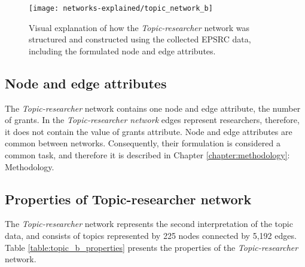 \begin{figure}[!htbp]
    \centering
    \texttt{[image: networks-explained/topic\_network\_b]}
    \caption[Visual explanation of how the \textit{Topic-researcher} network was structured and constructed using the collected EPSRC data]{Visual explanation of how the \textit{Topic-researcher} network was structured and constructed using the collected EPSRC data, including the formulated node and edge attributes.}
    \label{figure:topic_b_structure}
\end{figure}

\subsection{Node and edge attributes}

The \textit{Topic-researcher} network contains one node and edge attribute, the number of grants. In the \textit{Topic-researcher network} edges represent researchers, therefore, it does not contain the value of grants attribute. Node and edge attributes are common between networks. Consequently, their formulation is considered a common task, and therefore it is described in Chapter \ref{chapter:methodology}: Methodology.

\subsection{Properties of Topic-researcher network}

The \textit{Topic-researcher} network represents the second interpretation of the topic data, and consists of topics represented by 225 nodes connected by 5,192 edges. Table \ref{table:topic_b_properties} presents the properties of the \textit{Topic-researcher} network.


